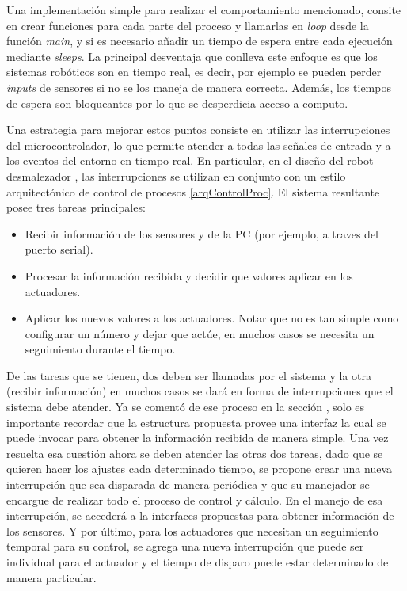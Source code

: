 Una implementación simple para realizar el comportamiento mencionado, consite en crear funciones para cada parte del proceso y llamarlas en \textit{loop} desde la función \textit{main}, y si es necesario añadir un tiempo de espera entre cada ejecución mediante \textit{sleeps}. La principal desventaja que conlleva este enfoque es que los sistemas robóticos son en tiempo real, es decir, por ejemplo se pueden perder \textit{inputs} de sensores si no se los maneja de manera correcta. Además, los tiempos de espera son bloqueantes por lo que se desperdicia acceso a computo.

Una estrategia para mejorar estos puntos consiste en utilizar las interrupciones del microcontrolador, lo que permite atender a todas las señales de entrada y a los eventos del entorno en tiempo real. En particular, en el diseño del robot desmalezador \cite{paperPomponio}, las interrupciones se utilizan en conjunto con un estilo arquitectónico de control de procesos \ref{arqControlProc}. El sistema resultante posee tres tareas principales:

\begin{itemize}
    \item Recibir información de los sensores y de la PC (por ejemplo, a traves del puerto serial).
    \item Procesar la información recibida y decidir que valores aplicar en los actuadores.
    \item Aplicar los nuevos valores a los actuadores. Notar que no es tan simple como configurar un número y dejar que actúe, en muchos casos se necesita un seguimiento durante el tiempo.
\end{itemize}

De las tareas que se tienen, dos deben ser llamadas por el sistema y la otra (recibir información) en muchos casos se dará en forma de interrupciones que el sistema debe atender. Ya se comentó de ese proceso en la sección , solo es importante recordar que la estructura propuesta provee una interfaz la cual se puede invocar para obtener la información recibida de manera simple. Una vez resuelta esa cuestión ahora se deben atender las otras dos tareas, dado que se quieren hacer los ajustes cada determinado tiempo, se propone crear una nueva interrupción que sea disparada de manera periódica y que su manejador se encargue de realizar todo el proceso de control y cálculo. En el manejo de esa interrupción, se accederá a la interfaces propuestas para obtener información de los sensores. Y por último, para los actuadores que necesitan un seguimiento temporal para su control, se agrega una nueva interrupción que puede ser individual para el actuador y el tiempo de disparo puede estar determinado de manera particular.

